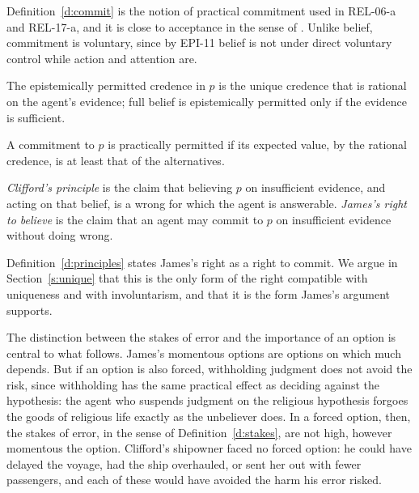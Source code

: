 \documentclass{situationist-preprint}
\begin{document}
Definition~\ref{d:commit} is the notion of practical commitment used in REL-06-a and REL-17-a, and it is close to acceptance in the sense of \citet{Cohen1992}. Unlike belief, commitment is voluntary, since by EPI-11 belief is not under direct voluntary control while action and attention are.

\begin{principle}[Fit]\label{p:fit}
The epistemically permitted credence in $p$ is the unique credence that is rational on the agent's evidence; full belief is epistemically permitted only if the evidence is sufficient.
\end{principle}

\begin{principle}\label{p:practical}
A commitment to $p$ is practically permitted if its expected value, by the rational credence, is at least that of the alternatives.
\end{principle}

\begin{definition}\label{d:principles}
\emph{Clifford's principle} is the claim that believing $p$ on insufficient evidence, and acting on that belief, is a wrong for which the agent is answerable. \emph{James's right to believe} is the claim that an agent may commit to $p$ on insufficient evidence without doing wrong.
\end{definition}

Definition~\ref{d:principles} states James's right as a right to commit. We argue in Section~\ref{s:unique} that this is the only form of the right compatible with uniqueness and with involuntarism, and that it is the form James's argument supports.

The distinction between the stakes of error and the importance of an option is central to what follows. James's momentous options are options on which much depends. But if an option is also forced, withholding judgment does not avoid the risk, since withholding has the same practical effect as deciding against the hypothesis: the agent who suspends judgment on the religious hypothesis forgoes the goods of religious life exactly as the unbeliever does. In a forced option, then, the stakes of error, in the sense of Definition~\ref{d:stakes}, are not high, however momentous the option. Clifford's shipowner faced no forced option: he could have delayed the voyage, had the ship overhauled, or sent her out with fewer passengers, and each of these would have avoided the harm his error risked.
\end{document}

